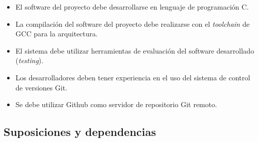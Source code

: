 \documentclass[12pt,a4paper, twosite]{article}
\begin{document}








\begin{itemize}
  \item El software del proyecto debe desarrollarse en lenguaje de programación C.
  \item La compilación del software del proyecto debe realizarse con el \textit{toolchain}
  de GCC para la arquitectura.
  \item El sistema debe utilizar herramientas de evaluación del software desarrollado
  (\textit{testing}).
  \item Los desarrolladores deben tener experiencia en el uso del sistema de control de
  versiones Git.
  \item Se debe utilizar Github como servidor de repositorio Git remoto.
\end{itemize}

\subsection{Suposiciones y dependencias}
\label{sec:org0ae23fe}

\end{document}
